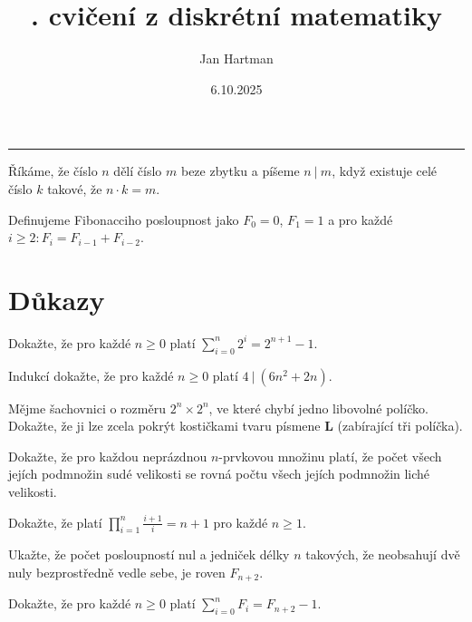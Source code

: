 \documentclass[10pt]{article}
\title{\tutnum. cvičení z diskrétní matematiky}
\author{Jan Hartman}
\date{6.10.2025}
\newcommand{\titlerule}{%
    \noindent %
    \makebox[\textwidth]{\large \thetitle \hfill \thedate}
    \rule{\textwidth}{0.4pt}%
}
\begin{document}
\titlerule

\begin{defn}
    Říkáme, že číslo $n$ dělí číslo $m$ beze zbytku a píšeme $n \ | \ m$, když existuje celé číslo $k$ takové, že $n \cdot k = m$.
\end{defn}

\begin{defn}
    Definujeme Fibonacciho posloupnost jako $F_0 = 0$, $F_1 = 1$ a pro každé $i \geq 2 : F_i = F_{i-1} + F_{i-2}$.
\end{defn}

\section{Důkazy}

\begin{problem}
Dokažte, že pro každé $n \geq 0$ platí $\sum_{i=0}^{n}2^i = 2^{n+1} - 1$.
\end{problem}

\begin{problem}[Dělitelnost]
Indukcí dokažte, že pro každé $n \geq 0$ platí $4 \ | \ (6n^2 + 2n)$.
\end{problem}

\begin{problem}[Šachovnice]
Mějme šachovnici o rozměru $2^n \times 2^n$, ve které chybí jedno libovolné políčko. Dokažte, že ji lze zcela pokrýt kostičkami tvaru písmene \textbf{L} (zabírající tři políčka).
\end{problem}

\begin{problem}
Dokažte, že pro každou neprázdnou $n$-prvkovou množinu platí, že počet všech jejích podmnožin sudé velikosti se rovná počtu všech jejích podmnožin liché velikosti. 
\end{problem}

\begin{problem}
Dokažte, že platí $\prod_{i=1}^{n}\frac{i+1}{i} = n + 1$ pro každé $n \geq 1$.
\end{problem}

\begin{problem}
Ukažte, že počet posloupností nul a jedniček délky $n$ takových, že neobsahují dvě nuly bezprostředně vedle sebe, je roven $F_{n+2}$.
\end{problem}

\begin{problem}
Dokažte, že pro každé $n \geq 0$ platí $\sum_{i=0}^{n}F_i = F_{n+2}-1$.
\end{problem}
\end{document}
